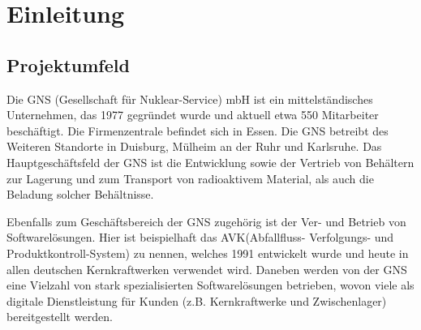 \documentclass[12pt, xcolor=dvipsnames]{scrartcl}
\begin{document}

\clearpage

\makeatletter
  \renewcommand\l@subsection{\@dottedtocline{2}{1.5em}{2.8em}}
\makeatother
{}
\tableofcontents


\listoffigures

\listoftables

\lstlistoflistings

\printnomenclature		
\clearpage



\section{Einleitung}

\subsection{Projektumfeld}
\label{sec:projektumfeld}

Die GNS (Gesellschaft für Nuklear-Service) mbH ist ein mittelständisches Unternehmen, das 1977 gegründet wurde und aktuell etwa 550 Mitarbeiter beschäftigt. Die Firmenzentrale befindet sich in Essen. Die GNS betreibt des Weiteren Standorte in Duisburg, Mülheim an der Ruhr und Karlsruhe. Das Hauptgeschäftsfeld der GNS ist die Entwicklung sowie der Vertrieb von Behältern zur Lagerung und zum Transport von radioaktivem Material, als auch die Beladung solcher Behältnisse.


Ebenfalls zum Geschäftsbereich der GNS zugehörig ist der Ver- und Betrieb von Softwarelösungen. Hier ist beispielhaft das AVK(Abfallfluss- Verfolgungs- und Produktkontroll-System) zu nennen, welches 1991 entwickelt wurde und heute in allen deutschen Kernkraftwerken verwendet wird.  Daneben werden von der GNS eine Vielzahl von stark spezialisierten Softwarelösungen betrieben, wovon viele als digitale Dienstleistung für Kunden (z.B. Kernkraftwerke und Zwischenlager) bereitgestellt werden. \\
\end{document}
